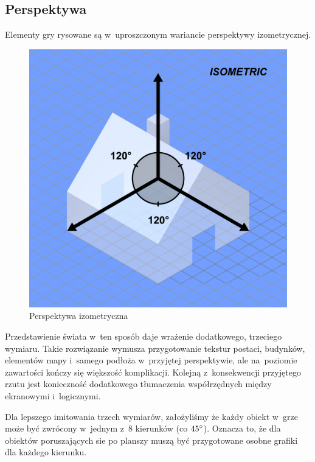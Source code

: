 \documentclass[licencjacka]{pracamgr}
\begin{document}
    \subsection{Perspektywa}
      Elementy gry rysowane są w~uproszczonym wariancie perspektywy izometrycznej.

      \begin{figure}[htbp]
	\centering
	\includegraphics[scale=0.25]{izo.png}
	\caption[BLAH]{Perspektywa izometryczna\protect\footnotemark}
      \end{figure}


      Przedstawienie świata w~ten sposób daje wrażenie dodatkowego, trzeciego wymiaru. Takie rozwiązanie wymusza przygotowanie tekstur
      postaci, budynków, elementów mapy i~samego podłoża w~przyjętej perspektywie, ale na~poziomie
      zawartości kończy się większość komplikacji. Kolejną z~konsekwencji przyjętego rzutu jest konieczność dodatkowego tłumaczenia
      współrzędnych między ekranowymi i~logicznymi.

      Dla lepszego imitowania trzech wymiarów, założyliśmy że każdy obiekt w~grze może być zwrócony w~jednym z~8 kierunków
      (co $45\degree$). Oznacza to, że dla obiektów poruszających sie po planszy muszą być przygotowane osobne grafiki dla każdego kierunku.
\end{document}
